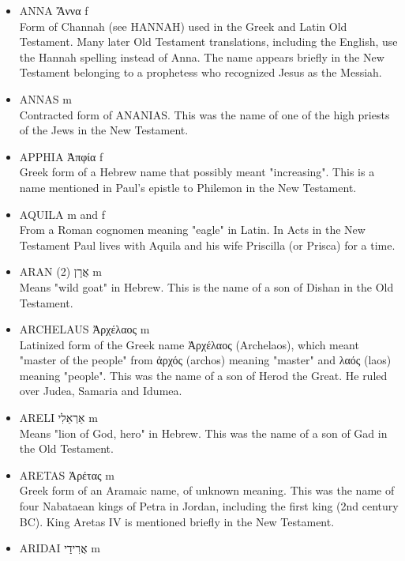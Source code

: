 \begin{itemize}
English form of the Greek name Ἀνδρέας (Andreas), which was derived from ἀνδρεῖος (andreios) meaning "manly, masculine", a derivative of ἀνήρ (aner) meaning "man". In the New Testament the apostle Andrew, the first disciple to join Jesus, is the brother of Simon Peter. Andrew, being a Greek name, was probably only a nickname or a translation of his real Hebrew name, which is not known.
\item {ANNA Ἄννα f}\\
Form of Channah (see HANNAH) used in the Greek and Latin Old Testament. Many later Old Testament translations, including the English, use the Hannah spelling instead of Anna. The name appears briefly in the New Testament belonging to a prophetess who recognized Jesus as the Messiah.
\item {ANNAS m}\\
Contracted form of ANANIAS. This was the name of one of the high priests of the Jews in the New Testament.
\item {APPHIA Ἀπφία f}\\
Greek form of a Hebrew name that possibly meant "increasing". This is a name mentioned in Paul's epistle to Philemon in the New Testament.
\item {AQUILA m and f}\\
From a Roman cognomen meaning "eagle" in Latin. In Acts in the New Testament Paul lives with Aquila and his wife Priscilla (or Prisca) for a time.
\item {ARAN (2) אֲרָן m}\\
Means "wild goat" in Hebrew. This is the name of a son of Dishan in the Old Testament.
\item {ARCHELAUS Ἀρχέλαος m}\\
Latinized form of the Greek name Ἀρχέλαος (Archelaos), which meant "master of the people" from ἀρχός (archos) meaning "master" and λαός (laos) meaning "people". This was the name of a son of Herod the Great. He ruled over Judea, Samaria and Idumea.
\item {ARELI אַרְאֵלִי m}\\
Means "lion of God, hero" in Hebrew. This was the name of a son of Gad in the Old Testament.
\item {ARETAS Ἀρέτας m}\\
Greek form of an Aramaic name, of unknown meaning. This was the name of four Nabataean kings of Petra in Jordan, including the first king (2nd century BC). King Aretas IV is mentioned briefly in the New Testament.
\item {ARIDAI אֲרִידַי m}\\

\end{itemize}

